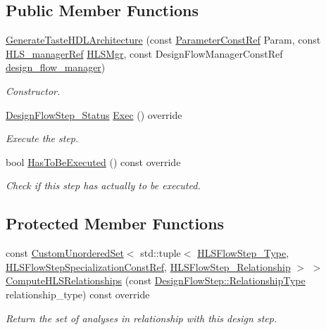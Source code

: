 \subsection*{Public Member Functions}
\begin{DoxyCompactItemize}
\item 
\hyperlink{classGenerateTasteHDLArchitecture_aa7b1d39591a7af5e449935a58564369c}{Generate\+Taste\+H\+D\+L\+Architecture} (const \hyperlink{Parameter_8hpp_a37841774a6fcb479b597fdf8955eb4ea}{Parameter\+Const\+Ref} Param, const \hyperlink{hls__manager_8hpp_acd3842b8589fe52c08fc0b2fcc813bfe}{H\+L\+S\+\_\+manager\+Ref} \hyperlink{classHLS__step_ade85003a99d34134418451ddc46a18e9}{H\+L\+S\+Mgr}, const Design\+Flow\+Manager\+Const\+Ref \hyperlink{classDesignFlowStep_ab770677ddf087613add30024e16a5554}{design\+\_\+flow\+\_\+manager})
\begin{DoxyCompactList}\small\item\em Constructor. \end{DoxyCompactList}\item 
\hyperlink{design__flow__step_8hpp_afb1f0d73069c26076b8d31dbc8ebecdf}{Design\+Flow\+Step\+\_\+\+Status} \hyperlink{classGenerateTasteHDLArchitecture_a6d92a9a5da5f96e8de1f4a2fab12c572}{Exec} () override
\begin{DoxyCompactList}\small\item\em Execute the step. \end{DoxyCompactList}\item 
bool \hyperlink{classGenerateTasteHDLArchitecture_ab7fb74172594a37df64a99f0afecc5da}{Has\+To\+Be\+Executed} () const override
\begin{DoxyCompactList}\small\item\em Check if this step has actually to be executed. \end{DoxyCompactList}\end{DoxyCompactItemize}
\subsection*{Protected Member Functions}
\begin{DoxyCompactItemize}
\item 
const \hyperlink{classCustomUnorderedSet}{Custom\+Unordered\+Set}$<$ std\+::tuple$<$ \hyperlink{hls__step_8hpp_ada16bc22905016180e26fc7e39537f8d}{H\+L\+S\+Flow\+Step\+\_\+\+Type}, \hyperlink{hls__step_8hpp_a5fdd2edf290c196531d21d68e13f0e74}{H\+L\+S\+Flow\+Step\+Specialization\+Const\+Ref}, \hyperlink{hls__step_8hpp_a3ad360b9b11e6bf0683d5562a0ceb169}{H\+L\+S\+Flow\+Step\+\_\+\+Relationship} $>$ $>$ \hyperlink{classGenerateTasteHDLArchitecture_a5599d8faaf3bda18a5b8a45875e4abb4}{Compute\+H\+L\+S\+Relationships} (const \hyperlink{classDesignFlowStep_a723a3baf19ff2ceb77bc13e099d0b1b7}{Design\+Flow\+Step\+::\+Relationship\+Type} relationship\+\_\+type) const override
\begin{DoxyCompactList}\small\item\em Return the set of analyses in relationship with this design step. \end{DoxyCompactList}\end{DoxyCompactItemize}
